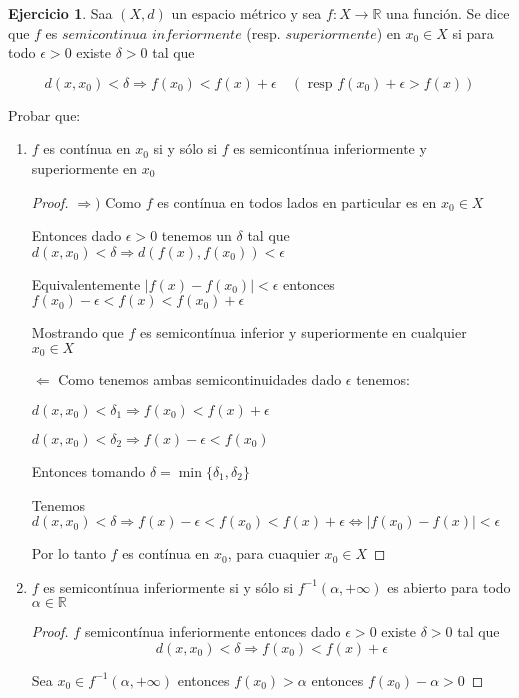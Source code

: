 \documentclass[11pt]{report}
\newcommand{\R}{\mathbb{R}}
\newcommand{\Ra}{\Rightarrow}
\newcommand{\ra}{\rightarrow}
\theoremstyle{definition}
\newtheorem{ej}{Ejercicio}
\begin{document}
	\begin{ej}
		Saa $(X,d)$ un espacio métrico y sea $f : X \ra \R$ una función. Se dice que $f$ es $semicontinua$ $inferiormente$ (resp. $superiormente$) en $x_0 \in X$ si para todo $\epsilon >0$ existe $\delta >0$ tal que 

		$$ d(x,x_0) < \delta \Longrightarrow f(x_0) < f(x) + \epsilon \quad (\text{ resp } f(x_0)+\epsilon > f(x))$$

		Probar que:

		\begin{enumerate}
			\item $f$ es contínua en $x_0$ si y sólo si $f$ es semicontínua inferiormente y superiormente en $x_0$
				\begin{proof}
					$\Ra )$ Como $f$ es contínua en todos lados en particular es en $x_0 \in X$ 

					Entonces dado $\epsilon > 0$ tenemos un $\delta$ tal que $d(x,x_0) < \delta \Ra d(f(x),f(x_0)) < \epsilon$ 

					Equivalentemente $|f(x)-f(x_0)| < \epsilon$ entonces $f(x_0) - \epsilon< f(x) < f(x_0) + \epsilon$

					Mostrando que $f$ es semicontínua inferior y superiormente en cualquier $x_0 \in X$

					$\Leftarrow$ Como tenemos ambas semicontinuidades dado $\epsilon$ tenemos:

					$d(x,x_0) < \delta_1 \Ra f(x_0) < f(x) + \epsilon$

					$d(x,x_0) < \delta_2 \Ra f(x) - \epsilon< f(x_0)$

					Entonces tomando $\delta = \min\{\delta_1,\delta_2\}$

					Tenemos $d(x,x_0) < \delta \Ra f(x) - \epsilon < f(x_0) < f(x) + \epsilon \iff |f(x_0) - f(x)| < \epsilon$

					Por lo tanto $f$ es contínua en $x_0$, para cuaquier $x_0 \in X$ 
				\end{proof}
				
			\item $f$ es semicontínua inferiormente si y sólo si $f^{-1}(\alpha,+\infty)$ es abierto para todo $\alpha \in \R$
				\begin{proof}
					$f$ semicontínua inferiormente entonces dado $\epsilon >0$ existe $\delta >0$ tal que 
					$$ d(x,x_0) < \delta \Ra f(x_0) < f(x) + \epsilon$$

					Sea $x_0 \in f^{-1}(\alpha,+\infty)$ entonces $f(x_0) > \alpha$ entonces $f(x_0) - \alpha > 0 $


\end{proof}
\end{enumerate}
\end{ej}
\end{document}
